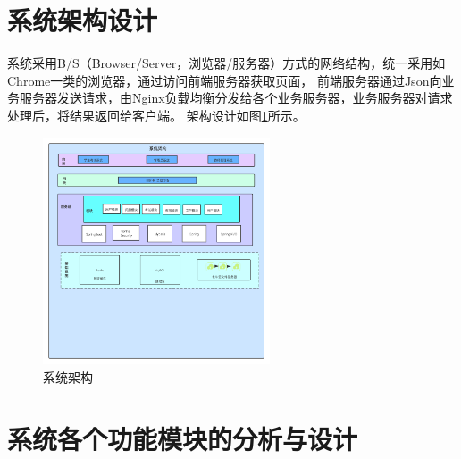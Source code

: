 \section{系统架构设计}
系统采用B/S（Browser/Server，浏览器/服务器）方式的网络结构，统一采用如Chrome一类的浏览器，通过访问前端服务器获取页面，
前端服务器通过Json向业务服务器发送请求，由Nginx负载均衡分发给各个业务服务器，业务服务器对请求处理后，将结果返回给客户端。
架构设计如图\ref{figure:jiagou}所示。
\begin{figure}[!htbp]
\centering
\includegraphics[width=0.6\textwidth,keepaspectratio]{data/chapter-2/jiagou.png}
\caption{系统架构}
\label{figure:jiagou}
\end{figure}

\section{系统各个功能模块的分析与设计}

\subsection{}